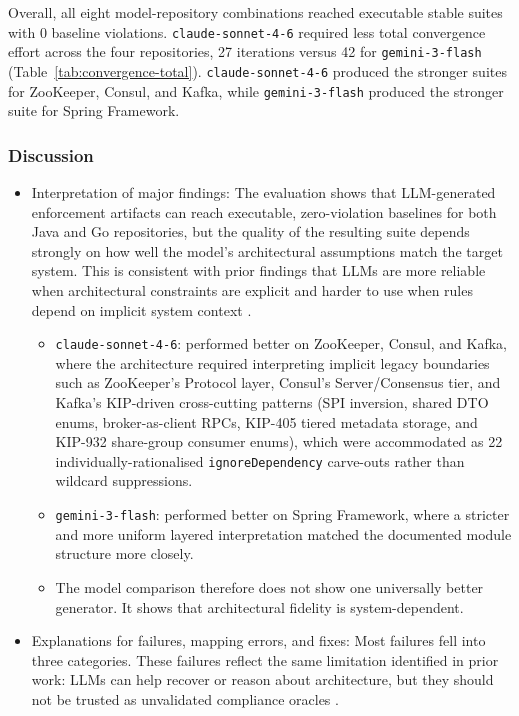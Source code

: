 \documentclass[sigconf,screen]{acmart}
\begin{document}
Overall, all eight model-repository combinations reached executable stable suites with 0 baseline violations. \texttt{claude-sonnet-4-6} required less total convergence effort across the four repositories, 27 iterations versus 42 for \texttt{gemini-3-flash} (Table~\ref{tab:convergence-total}). \texttt{claude-sonnet-4-6} produced the stronger suites for ZooKeeper, Consul, and Kafka, while \texttt{gemini-3-flash} produced the stronger suite for Spring Framework.

\subsubsection{Discussion}
\begin{itemize}
    \item Interpretation of major findings: The evaluation shows that LLM-generated enforcement artifacts can reach executable, zero-violation baselines for both Java and Go repositories, but the quality of the resulting suite depends strongly on how well the model's architectural assumptions match the target system. This is consistent with prior findings that LLMs are more reliable when architectural constraints are explicit and harder to use when rules depend on implicit system context \cite{schindler2024,su2026evaluating}.
    \begin{itemize}
        \item \texttt{claude-sonnet-4-6}: performed better on ZooKeeper, Consul, and Kafka, where the architecture required interpreting implicit legacy boundaries such as ZooKeeper's Protocol layer, Consul's Server/Consensus tier, and Kafka's KIP-driven cross-cutting patterns (SPI inversion, shared DTO enums, broker-as-client RPCs, KIP-405 tiered metadata storage, and KIP-932 share-group consumer enums), which were accommodated as 22 individually-rationalised \texttt{ignoreDependency} carve-outs rather than wildcard suppressions.
        \item \texttt{gemini-3-flash}: performed better on Spring Framework, where a stricter and more uniform layered interpretation matched the documented module structure more closely.
        \item The model comparison therefore does not show one universally better generator. It shows that architectural fidelity is system-dependent.
    \end{itemize}
    \item Explanations for failures, mapping errors, and fixes: Most failures fell into three categories. These failures reflect the same limitation identified in prior work: LLMs can help recover or reason about architecture, but they should not be trusted as unvalidated compliance oracles \cite{tessa2025,su2026evaluating}.

\end{itemize}
\end{document}
